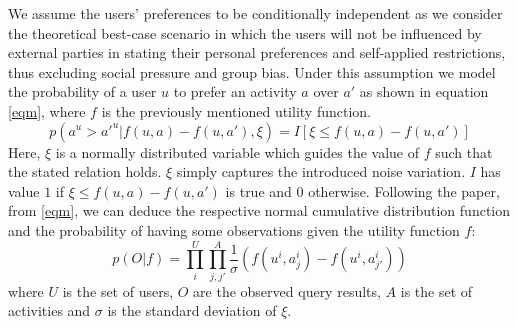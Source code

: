 \documentclass[11pt,a4paper,oneside]{article}
\begin{document}
We assume the users' preferences to be conditionally independent as we consider the theoretical best-case scenario in which the users will not be influenced by external parties in stating their personal preferences and self-applied restrictions, thus excluding social pressure and group bias. Under this assumption we model the probability of a user $u$ to prefer an activity $a$ over $a'$ as shown in equation \ref{eqm}, where $f$ is the previously mentioned utility function.
\begin{equation}
    \label{eqm}
    p(a^u > a'^u | f(u,a) - f(u,a'), \xi) = I[\xi \leq f(u,a) - f(u,a')]
\end{equation}
Here, $\xi$ is a normally distributed variable which guides the value of $f$ such that the stated relation holds. $\xi$ simply captures the introduced noise variation. $I$ has value $1$ if $\xi \leq f(u,a) - f(u,a')$ is true and $0$ otherwise. Following the paper, from \ref{eqm}, we can deduce the respective normal cumulative distribution function and the probability of having some observations given the utility function $f$:
\begin{equation}
    \label{eqm}
    p(O|f) = \prod_i^U \prod_{j, j'}^A \frac{1}{\sigma} (f(u^i, a^i_j) - f(u^i, a^i_{j'})) 
\end{equation}
where $U$ is the set of users, $O$ are the observed query results, $A$ is the set of activities and $\sigma$ is the standard deviation of $\xi$. 
\end{document}
